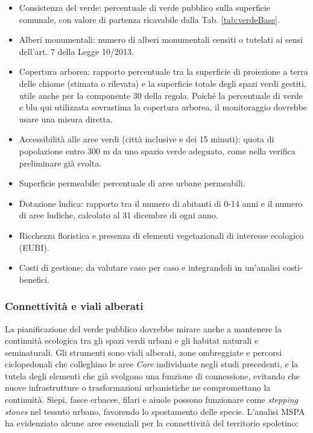 \documentclass[
  a4paper,
]{book}
\providecommand{\tightlist}{%
  \setlength{\itemsep}{0pt}\setlength{\parskip}{0pt}}
\begin{document}
\begin{itemize}
\tightlist
\item
  Consistenza del verde: percentuale di verde pubblico sulla superficie comunale, con valore di partenza ricavabile dalla Tab. \ref{tab:verdeBase}.
\item
  Alberi monumentali: numero di alberi monumentali censiti o tutelati ai sensi dell'art. 7 della Legge 10/2013.
\item
  Copertura arborea: rapporto percentuale tra la superficie di proiezione a terra delle chiome (stimata o rilevata) e la superficie totale degli spazi verdi gestiti, utile anche per la componente 30 della regola. Poiché la percentuale di verde e blu qui utilizzata sovrastima la copertura arborea, il monitoraggio dovrebbe usare una misura diretta.
\item
  Accessibilità alle aree verdi (città inclusive e dei 15 minuti): quota di popolazione entro 300 m da uno spazio verde adeguato, come nella verifica preliminare già svolta.
\item
  Superficie permeabile: percentuale di aree urbane permeabili.
\item
  Dotazione ludica: rapporto tra il numero di abitanti di 0-14 anni e il numero di aree ludiche, calcolato al 31 dicembre di ogni anno.
\item
  Ricchezza floristica e presenza di elementi vegetazionali di interesse ecologico (EUBI).
\item
  Costi di gestione: da valutare caso per caso e integrandoli in un'analisi costi-benefici.
\end{itemize}

\subsubsection{Connettività e viali alberati}\label{connettivituxe0-e-viali-alberati}

La pianificazione del verde pubblico dovrebbe mirare anche a mantenere la continuità ecologica tra gli spazi verdi urbani e gli habitat naturali e seminaturali.
Gli strumenti sono viali alberati, zone ombreggiate e percorsi ciclopedonali che colleghino le aree \emph{Core} individuate negli studi precedenti, e la tutela degli elementi che già svolgono una funzione di connessione, evitando che nuove infrastrutture o trasformazioni urbanistiche ne compromettano la continuità.
Siepi, fasce erbacee, filari e aiuole possono funzionare come \emph{stepping stones} nel tessuto urbano, favorendo lo spostamento delle specie.
L'analisi MSPA ha evidenziato alcune aree essenziali per la connettività del territorio spoletino:
\end{document}
